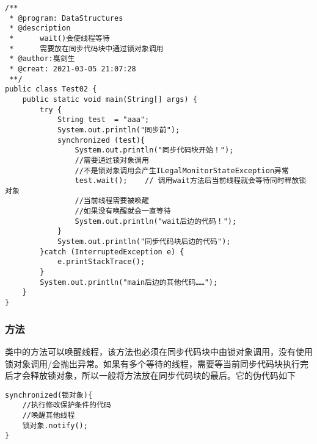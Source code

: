 \documentclass[a4paper]{report}
\begin{document}
\begin{Verbatim}[frame=single,numbersep=5pt,xleftmargin=1.5em,xrightmargin=1.5em]
/**
 * @program: DataStructures
 * @description
 *      wait()会使线程等待
 *      需要放在同步代码块中通过锁对象调用
 * @author:戛剑生
 * @creat: 2021-03-05 21:07:28
 **/
public class Test02 {
    public static void main(String[] args) {
        try {
            String test  = "aaa";
            System.out.println("同步前");
            synchronized (test){
                System.out.println("同步代码块开始！");
                //需要通过锁对象调用
                //不是锁对象调用会产生ILegalMonitorStateException异常
                test.wait();    // 调用wait方法后当前线程就会等待同时释放锁对象
                //当前线程需要被唤醒
                //如果没有唤醒就会一直等待
                System.out.println("wait后边的代码！");
            }
            System.out.println("同步代码块后边的代码");
        }catch (InterruptedException e) {
            e.printStackTrace();
        }
        System.out.println("main后边的其他代码……");
    }
}\end{Verbatim}
\subsubsection{方法}
类中的方法可以唤醒线程，该方法也必须在同步代码块中由锁对象调用，没有使用锁对象调用/会抛出异常。如果有多个等待的线程，需要等当前同步代码块执行完后才会释放锁对象，所以一般将方法放在同步代码块的最后。它的伪代码如下
\begin{lstlisting}
synchronized(锁对象){
    //执行修改保护条件的代码
    //唤醒其他线程
    锁对象.notify();
}
\end{lstlisting}
\end{document}
